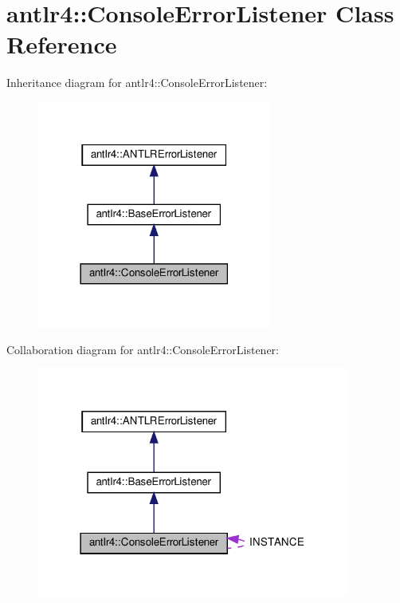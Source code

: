 \hypertarget{classantlr4_1_1ConsoleErrorListener}{}\section{antlr4\+:\+:Console\+Error\+Listener Class Reference}
\label{classantlr4_1_1ConsoleErrorListener}


Inheritance diagram for antlr4\+:\+:Console\+Error\+Listener\+:
\nopagebreak
\begin{figure}[H]
\begin{center}
\leavevmode
\includegraphics[width=218pt]{classantlr4_1_1ConsoleErrorListener__inherit__graph}
\end{center}
\end{figure}


Collaboration diagram for antlr4\+:\+:Console\+Error\+Listener\+:
\nopagebreak
\begin{figure}[H]
\begin{center}
\leavevmode
\includegraphics[width=291pt]{classantlr4_1_1ConsoleErrorListener__coll__graph}
\end{center}
\end{figure}
